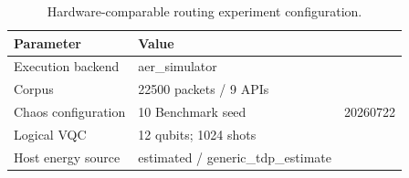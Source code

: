 \begin{table}[htbp]
\caption{Hardware-comparable routing experiment configuration.}
\label{tab:routing-experiment-configuration}
\centering
\begin{tabular}{ll}
\hline
Parameter & Value \\
\hline
Execution backend & aer\_simulator \\
Corpus & 22500 packets / 9 APIs \\
Chaos configuration & 10%
Benchmark seed & 20260722 \\
Logical VQC & 12 qubits; 1024 shots \\
Host energy source & estimated / generic\_tdp\_estimate \\
\hline
\end{tabular}
\end{table}
